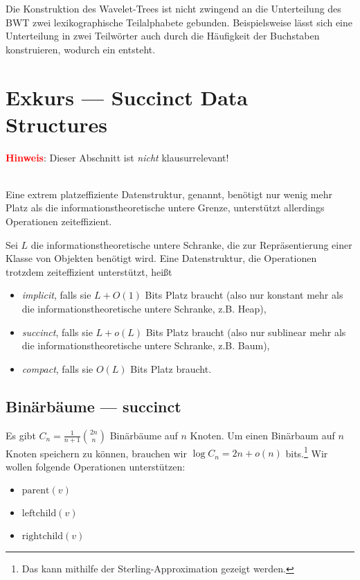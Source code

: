 Die Konstruktion des Wavelet-Trees ist nicht zwingend an die Unterteilung des BWT zwei lexikographische Teilalphabete gebunden. Beispielsweise lässt sich eine Unterteilung in zwei Teilwörter auch durch die Häufigkeit der Buchstaben konstruieren, wodurch ein  entsteht.

\section{Exkurs --- Succinct Data Structures}

\textcolor{red}{\textbf{Hinweis}}: Dieser Abschnitt ist \emph{nicht} klausurrelevant!

\ \\

Eine extrem platzeffiziente Datenstruktur,  genannt, benötigt nur wenig mehr Platz als die informationstheoretische untere Grenze, unterstützt allerdings Operationen zeiteffizient.

Sei \( L \) die informationstheoretische untere Schranke, die zur Repräsentierung einer Klasse von Objekten benötigt wird. Eine Datenstruktur, die Operationen trotzdem zeiteffizient unterstützt, heißt
\begin{itemize}
  \item \emph{implicit}, falls sie \( L + O(1) \) Bits Platz braucht (also nur konstant mehr als die informationstheoretische untere Schranke, z.B. Heap),
  \item \emph{succinct}, falls sie \( L + o(L) \) Bits Platz braucht (also nur sublinear mehr als die informationstheoretische untere Schranke, z.B. Baum),
  \item \emph{compact}, falls sie \( O(L) \) Bits Platz braucht. 
\end{itemize}

\subsection{Binärbäume --- succinct}

Es gibt \( C_n = \frac{1}{n+1}\binom{2n}{n} \) Binärbäume auf \( n \) Knoten. Um einen Binärbaum auf \( n \) Knoten speichern zu können, brauchen wir \( \log C_n = 2n + o(n) \) bits.\footnote{Das kann mithilfe der Sterling-Approximation gezeigt werden.} Wir wollen folgende Operationen unterstützen:
\begin{itemize}
  \item \( \text{parent}(v) \)
  \item \( \text{leftchild}(v) \)
  \item \( \text{rightchild}(v) \)
\end{itemize}

